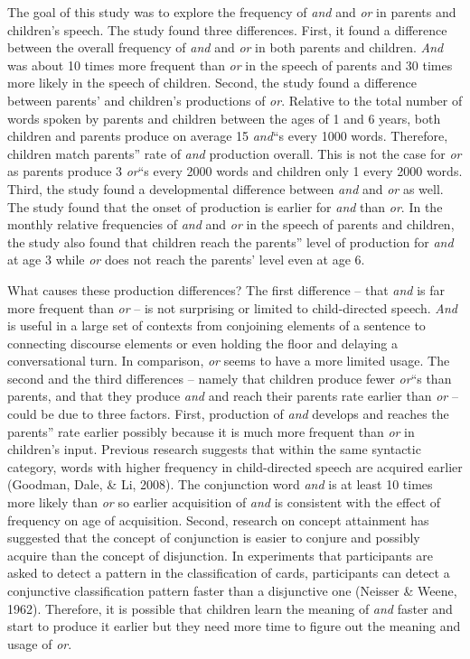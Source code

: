 \documentclass[floatsintext,man]{apa6}
\theoremstyle{definition}
\theoremstyle{definition}
\theoremstyle{definition}
\theoremstyle{remark}
\begin{document}
The goal of this study was to explore the frequency of \emph{and} and
\emph{or} in parents and children's speech. The study found three
differences. First, it found a difference between the overall frequency
of \emph{and} and \emph{or} in both parents and children. \emph{And} was
about 10 times more frequent than \emph{or} in the speech of parents and
30 times more likely in the speech of children. Second, the study found
a difference between parents' and children's productions of \emph{or}.
Relative to the total number of words spoken by parents and children
between the ages of 1 and 6 years, both children and parents produce on
average 15 \emph{and}\enquote{s every 1000 words. Therefore, children
match parents} rate of \emph{and} production overall. This is not the
case for \emph{or} as parents produce 3 \emph{or}\enquote{s every 2000
words and children only 1 every 2000 words. Third, the study found a
developmental difference between \emph{and} and \emph{or} as well. The
study found that the onset of production is earlier for \emph{and} than
\emph{or}. In the monthly relative frequencies of \emph{and} and
\emph{or} in the speech of parents and children, the study also found
that children reach the parents} level of production for \emph{and} at
age 3 while \emph{or} does not reach the parents' level even at age 6.

What causes these production differences? The first difference -- that
\emph{and} is far more frequent than \emph{or} -- is not surprising or
limited to child-directed speech. \emph{And} is useful in a large set of
contexts from conjoining elements of a sentence to connecting discourse
elements or even holding the floor and delaying a conversational turn.
In comparison, \emph{or} seems to have a more limited usage. The second
and the third differences -- namely that children produce fewer
\emph{or}\enquote{s than parents, and that they produce \emph{and} and
reach their parents rate earlier than \emph{or} -- could be due to three
factors. First, production of \emph{and} develops and reaches the
parents} rate earlier possibly because it is much more frequent than
\emph{or} in children's input. Previous research suggests that within
the same syntactic category, words with higher frequency in
child-directed speech are acquired earlier (Goodman, Dale, \& Li, 2008).
The conjunction word \emph{and} is at least 10 times more likely than
\emph{or} so earlier acquisition of \emph{and} is consistent with the
effect of frequency on age of acquisition. Second, research on concept
attainment has suggested that the concept of conjunction is easier to
conjure and possibly acquire than the concept of disjunction. In
experiments that participants are asked to detect a pattern in the
classification of cards, participants can detect a conjunctive
classification pattern faster than a disjunctive one (Neisser \& Weene,
1962). Therefore, it is possible that children learn the meaning of
\emph{and} faster and start to produce it earlier but they need more
time to figure out the meaning and usage of \emph{or}.
\end{document}
